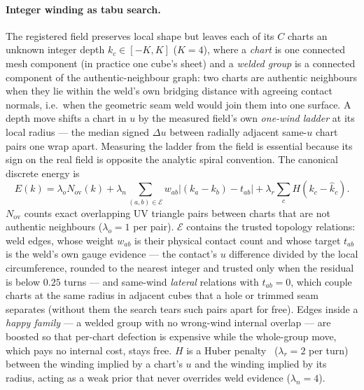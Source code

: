 \paragraph{Integer winding as tabu search.} The registered field preserves local shape but leaves each of its $C$ charts an unknown integer depth $k_c\in[-K,K]$ ($K{=}4$), where a {\em chart} is one connected mesh component (in practice one cube's sheet) and a {\em welded group} is a connected component of the authentic-neighbour graph: two charts are authentic neighbours when they lie within the weld's own bridging distance with agreeing contact normals, i.e.\ when the geometric seam weld would join them into one surface. A depth move shifts a chart in $u$ by the measured field's own {\em one-wind ladder} at its local radius --- the median signed $\Delta u$ between radially adjacent same-$u$ chart pairs one wrap apart. Measuring the ladder from the field is essential because its sign on the real field is opposite the analytic spiral convention. The canonical discrete energy is
\begin{equation*}
 E(k)=\lambda_o N_{\mathrm{ov}}(k)
   +\lambda_n\!\sum_{(a,b)\in\mathcal E}w_{ab}
      \left|(k_a-k_b)-t_{ab}\right|
   +\lambda_r\!\sum_c H(k_c-\widehat{k}_c).
\end{equation*}
$N_{\mathrm{ov}}$ counts exact overlapping UV triangle pairs between charts that are not authentic neighbours ($\lambda_o{=}1$ per pair). $\mathcal E$ contains the trusted topology relations: weld edges, whose weight $w_{ab}$ is their physical contact count and whose target $t_{ab}$ is the weld's own gauge evidence --- the contact's $u$ difference divided by the local circumference, rounded to the nearest integer and trusted only when the residual is below $0.25$ turns --- and same-wind {\em lateral} relations with $t_{ab}=0$, which couple charts at the same radius in adjacent cubes that a hole or trimmed seam separates (without them the search tears such pairs apart for free). Edges inside a {\em happy family} --- a welded group with no wrong-wind internal overlap --- are boosted so that per-chart defection is expensive while the whole-group move, which pays no internal cost, stays free. $H$ is a Huber penalty~\cite{huber1964robust} ($\lambda_r{=}2$ per turn) between the winding implied by a chart's $u$ and the winding implied by its radius, acting as a weak prior that never overrides weld evidence ($\lambda_n{=}4$).

